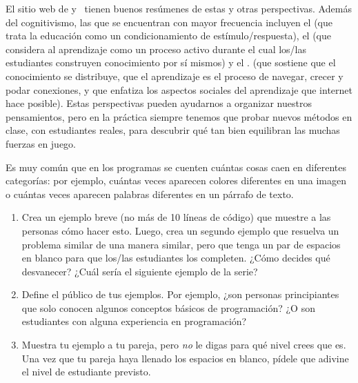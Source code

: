El sitio web de 
y~\cite{Wibu2016}
tienen buenos resúmenes de estas y otras perspectivas.
Además del cognitivismo, las que se encuentran con mayor frecuencia incluyen el 
(que trata la educación como un condicionamiento de estímulo/respuesta),
el 
(que considera al aprendizaje como un proceso activo durante el cual los/las estudiantes construyen conocimiento por sí mismos)
y el .
(que sostiene que el conocimiento se distribuye,
que el aprendizaje es el proceso de navegar, crecer y podar conexiones,
y que enfatiza los aspectos sociales del aprendizaje que internet hace posible).
Estas perspectivas pueden ayudarnos a organizar nuestros pensamientos,
pero en la práctica
siempre tenemos que probar nuevos métodos en clase,
con estudiantes reales,
para descubrir qué tan bien equilibran las muchas fuerzas en juego.



Es muy común que en los programas se cuenten cuántas cosas caen en diferentes categorías:
por ejemplo,
cuántas veces aparecen colores diferentes en una imagen
o cuántas veces aparecen palabras diferentes en un párrafo de texto.

\begin{enumerate}
\item
    Crea un ejemplo breve (no más de 10 líneas de código) que muestre a las personas cómo hacer esto.
    Luego, crea un segundo ejemplo que resuelva un problema similar de una manera similar,
    pero que tenga un par de espacios en blanco para que los/las estudiantes los completen.
    ¿Cómo decides qué desvanecer?
    ¿Cuál sería el siguiente ejemplo de la serie?

\item
    Define el público de tus ejemplos.
    Por ejemplo,
    ¿son  personas principiantes que solo conocen algunos conceptos básicos de programación?
    ¿O son estudiantes con alguna experiencia en programación?

\item
    Muestra tu ejemplo a tu pareja,
    pero \emph{no} le digas para qué nivel crees que es.
    Una vez que tu pareja haya llenado los espacios en blanco,
    pídele que adivine el nivel de estudiante previsto.

\end{enumerate}

